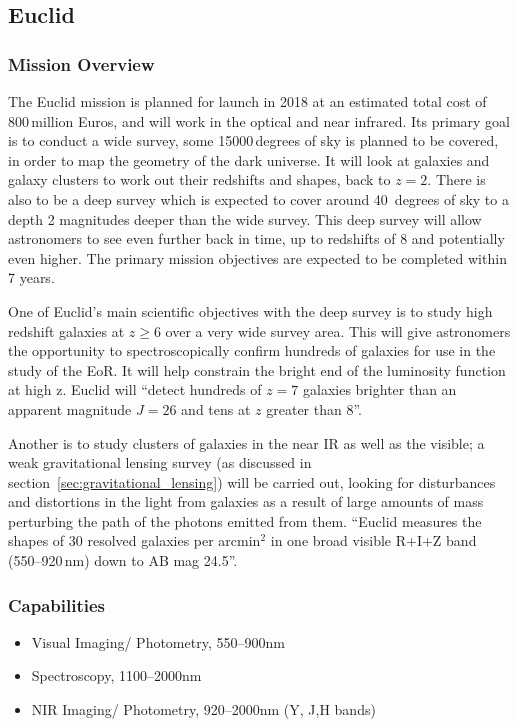 
\subsection{Euclid} %
\label{sub:euclid}

	\subsubsection{Mission Overview} %
	\label{ssub:mission_overview}
		The Euclid mission is planned for launch in 2018\cite[p.~8]{Euclid_Definition_Study_Report} at an estimated total cost of 800\,million Euros, and will work in the optical and near infrared\cite{bbc_euclid}. Its primary goal is to conduct a wide survey, some 15000\,degrees of sky is planned to be covered, in order to map the geometry of the dark universe. It will look at galaxies and galaxy clusters to work out their redshifts and shapes, back to $z=2$. There is also to be a deep survey which is expected to cover around 40\, degrees of sky to a depth 2 magnitudes deeper than the wide survey. This deep survey will allow astronomers to see even further back in time, up to redshifts of 8 and potentially even higher. The primary mission objectives are expected to be completed within 7 years.

		One of Euclid's main scientific objectives with the deep survey is to study high redshift galaxies at $z\ge6$ over a very wide survey area. This will give astronomers the opportunity to spectroscopically confirm hundreds of galaxies for use in the study of the EoR. It will help constrain the bright end of the luminosity function at high z. Euclid will ``detect hundreds of $z=7$ galaxies brighter than an apparent magnitude $J=26$ and tens at $z$ greater than 8''\cite{Euclid_Definition_Study_Report}.

		Another is to study clusters of galaxies in the near IR as well as the visible; a weak gravitational lensing survey (as discussed in section~\ref{sec:gravitational_lensing}) will be carried out, looking for disturbances and distortions in the light from galaxies as a result of large amounts of mass perturbing the path of the photons emitted from them. ``Euclid measures the shapes of 30 resolved galaxies per arcmin$^2$ in one broad visible R+I+Z band (550--920\,\si{\nano\metre}) down to AB mag 24.5''\cite[p.~9]{Euclid_Definition_Study_Report}.

	\subsubsection{Capabilities} %
	\label{ssub:euclid_capabilities}
		\begin{itemize}
			\item Visual Imaging/ Photometry, 550--900\si{\nano\metre}
			\item Spectroscopy, 1100--2000\si{\nano\metre}
			\item NIR Imaging/ Photometry, 920--2000\si{\nano\metre} (Y, J,H bands)
		\end{itemize}

